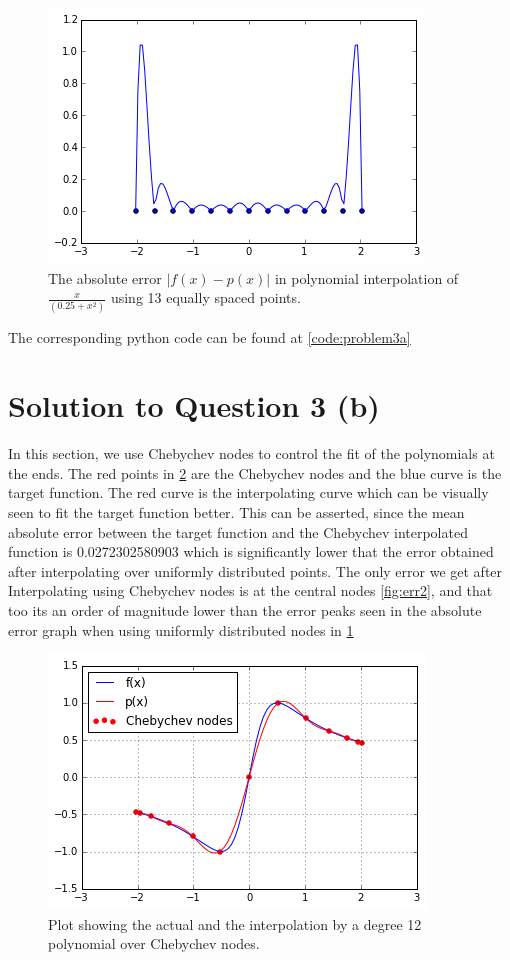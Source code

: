 \documentclass[a4paper,11pt]{article}
\begin{document}
\begin{figure}[h]
	\center
	\includegraphics[scale=0.65]{err1.png}
    \caption{The absolute error $|f(x) - p(x)|$ in polynomial interpolation of $\frac{x}{(0.25 + x^2)}$ using 13 equally spaced points.}
	\label{fig:err1}
\end{figure}
	

The corresponding python code can be found at \ref{code:problem3a}
\clearpage

\section{Solution to Question 3 (b)}\label{prob3b}

In this section, we use Chebychev nodes to control the fit of the polynomials at the ends. The red points in \ref{fig:fig2} are the Chebychev nodes and the blue curve is the target function. The red curve is the interpolating curve which can be visually seen to fit the target function better. This can be asserted, since the mean absolute error between the target function and the Chebychev interpolated function is 0.0272302580903 which is significantly lower that the error obtained after interpolating over uniformly distributed points. The only error we get after Interpolating using Chebychev nodes is at the central nodes \ref{fig:err2}, and that too its an order of magnitude lower than the error peaks seen in the absolute error graph when using uniformly distributed nodes in \ref{fig:err1}

\begin{figure}[h]
    \centering
    \includegraphics[scale=0.65]{fig2.png}
    \caption{Plot showing the actual and the interpolation by a degree 12 polynomial over Chebychev nodes.}
    \label{fig:fig2}
\end{figure}
\end{document}
